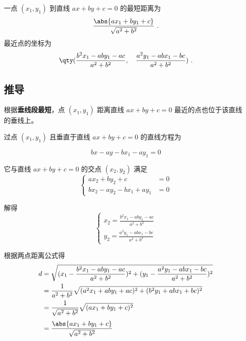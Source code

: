 
\begin{issues}
\issueDraft
\end{issues}

一点 $(x_1,y_1)$ 到直线 $ax + by + c = 0$ 的最短距离为
\begin{equation}
\frac{\abs{ax_1 + by_1 + c}}{\sqrt{a^2 + b^2}}~.
\end{equation}
最近点的坐标为
\begin{equation}
\qty(
\frac{b^2x_1 - aby_1 - ac}{a^2 + b^2}, \quad
\frac{a^2y_1 - abx_1 - bc}{a^2 + b^2})~.
\end{equation}

\subsection{推导}

根据\textbf{垂线段最短}，点 $(x_1, y_1)$ 距离直线 $ax + by + c = 0$ 最近的点也位于该直线的垂线上。

过点 $(x_1, y_1)$ 且垂直于直线 $ax+by+c=0$ 的直线方程为

\begin{equation}
bx - ay - bx_1 - ay_1 = 0
\end{equation}

它与直线 $ax + by + c = 0$ 的交点 $(x_2, y_2)$ 满足
\begin{equation}
\left\lbrace
\begin{aligned}
ax_2 + by_2 + c &= 0\\
bx_2 - ay_2-bx_1 + ay_1 &= 0
\end{aligned}
\right.
\end{equation}

解得
\begin{equation}
\left\lbrace
\begin{aligned}
x_2=\frac{b^2x_1 - aby_1 - ac}{a^2 + b^2}\\
y_2=\frac{a^2y_1 - abx_1 - bc}{a^2 + b^2}
\end{aligned}
\right.
\end{equation}

根据两点距离公式得
\begin{equation}
\begin{split}
d&=\sqrt{(x_1-\frac{b^2x_1 - aby_1 - ac}{a^2 + b^2})^2 + (y_1-\frac{a^2y_1 - abx_1 - bc}{a^2 + b^2})^2}\\
&=\frac{1}{a^2 + b^2}\sqrt{(a^2x_1 + aby_1 + ac)^2 + (b^2y_1 + abx_1 + bc)^2}\\
&=\frac{1}{\sqrt{a^2 + b^2}}\sqrt{(ax_1 + by_1 + c)^2}\\[3pt]
&=\frac{\abs{ax_1 + by_1 + c}}{\sqrt{a^2 + b^2}}\\
\end{split}
\end{equation}

